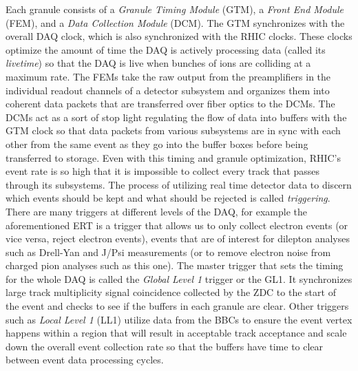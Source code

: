 Each granule consists of a \textit{Granule Timing Module} (GTM), a \textit{Front End Module} (FEM), and a \textit{Data Collection Module} (DCM).  The GTM synchronizes with the overall DAQ clock, which is also synchronized with the RHIC clocks. These clocks optimize the amount of time the DAQ is actively processing data (called its \textit{livetime}) so that the DAQ is live when bunches of ions are colliding at a maximum rate. The FEMs take the raw output from the preamplifiers in the individual readout channels of a detector subsystem and organizes them into coherent data packets that are transferred over fiber optics to the DCMs. The DCMs act as a sort of stop light regulating the flow of data into buffers with the GTM clock so that data packets from various subsystems are in sync with each other from the same event as they go into the buffer boxes before being transferred to storage. Even with this timing and granule optimization, RHIC's event rate is so high that it is impossible to collect every track that passes through its subsystems. The process of utilizing real time detector data to discern which events should be kept and what should be rejected is called \textit{triggering}. There are many triggers at different levels of the DAQ, for example the aforementioned ERT is a trigger that allows us to only collect electron events (or vice versa, reject electron events), events that are of interest for dilepton analyses such as Drell-Yan and J/Psi measurements (or to remove electron noise from charged pion analyses such as this one). The master trigger that sets the timing for the whole DAQ is called the \textit{Global Level 1} trigger or the GL1. It synchronizes large track multiplicity signal coincidence collected by the ZDC to the start of the event and checks to see if the buffers in each granule are clear. Other triggers such as \textit{Local Level 1} (LL1) utilize data from the BBCs to ensure the event vertex happens within a region that will result in acceptable track acceptance and scale down the overall event collection rate so that the buffers have time to clear between event data processing cycles.

